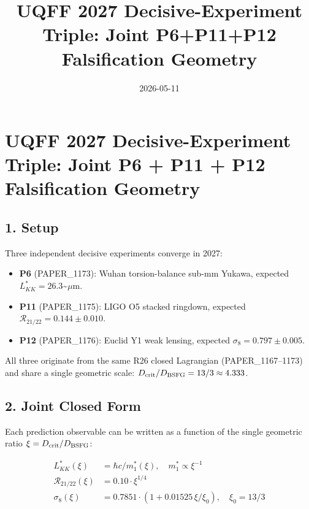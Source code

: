 \documentclass[
]{article}
\title{UQFF 2027 Decisive-Experiment Triple: Joint P6+P11+P12
Falsification Geometry}
\author{}
\date{2026-05-11}
\providecommand{\tightlist}{%
  \setlength{\itemsep}{0pt}\setlength{\parskip}{0pt}}
\begin{document}
\maketitle

\section{UQFF 2027 Decisive-Experiment Triple: Joint P6 + P11 + P12
Falsification
Geometry}\label{uqff-2027-decisive-experiment-triple-joint-p6-p11-p12-falsification-geometry}

\subsection{1. Setup}\label{setup}

Three independent decisive experiments converge in 2027:

\begin{itemize}
\tightlist
\item
  \textbf{P6} (PAPER\_1173): Wuhan torsion-balance sub-mm Yukawa,
  expected \(L_{KK}^* = 26.3\)\textasciitilde{}\(\mu\)m.
\item
  \textbf{P11} (PAPER\_1175): LIGO O5 stacked ringdown, expected
  \(\mathcal{R}_{21/22} = 0.144 \pm 0.010\).
\item
  \textbf{P12} (PAPER\_1176): Euclid Y1 weak lensing, expected
  \(\sigma_8 = 0.797 \pm 0.005\).
\end{itemize}

All three originate from the same R26 closed Lagrangian
(PAPER\_1167--1173) and share a single geometric scale:
\(D_{\rm crit}/D_{\rm BSFG} = 13/3 \approx 4.333\).

\subsection{2. Joint Closed Form}\label{joint-closed-form}

Each prediction observable can be written as a function of the single
geometric ratio \(\xi = D_{\rm crit}/D_{\rm BSFG}\):

\[
\begin{aligned}
L_{KK}^*(\xi)        &= \hbar c / m_1^*(\xi),\quad m_1^* \propto \xi^{-1} \\
\mathcal{R}_{21/22}(\xi) &= 0.10 \cdot \xi^{1/4} \\
\sigma_8(\xi)        &= 0.7851 \cdot (1 + 0.01525\,\xi/\xi_0),\quad \xi_0 = 13/3
\end{aligned}
\]
\end{document}
